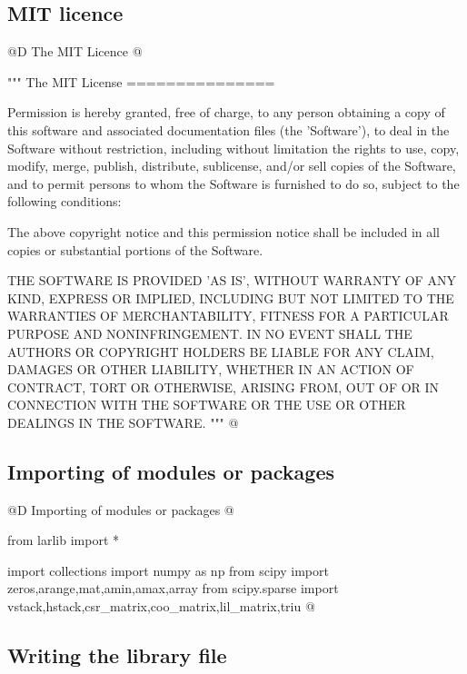 \documentclass[11pt,oneside]{article}	%
\begin{document}
\subsection{MIT licence}
@D The MIT Licence
@{
"""
The MIT License
===============
	
Permission is hereby granted, free of charge, to any person obtaining
a copy of this software and associated documentation files (the
'Software'), to deal in the Software without restriction, including
without limitation the rights to use, copy, modify, merge, publish,
distribute, sublicense, and/or sell copies of the Software, and to
permit persons to whom the Software is furnished to do so, subject to
the following conditions:

The above copyright notice and this permission notice shall be
included in all copies or substantial portions of the Software.

THE SOFTWARE IS PROVIDED 'AS IS', WITHOUT WARRANTY OF ANY KIND,
EXPRESS OR IMPLIED, INCLUDING BUT NOT LIMITED TO THE WARRANTIES OF
MERCHANTABILITY, FITNESS FOR A PARTICULAR PURPOSE AND NONINFRINGEMENT.
IN NO EVENT SHALL THE AUTHORS OR COPYRIGHT HOLDERS BE LIABLE FOR ANY
CLAIM, DAMAGES OR OTHER LIABILITY, WHETHER IN AN ACTION OF CONTRACT,
TORT OR OTHERWISE, ARISING FROM, OUT OF OR IN CONNECTION WITH THE
SOFTWARE OR THE USE OR OTHER DEALINGS IN THE SOFTWARE.
"""
@}
\subsection{Importing of modules or packages}
@D Importing of modules or packages
@{from larlib import *

import collections
import numpy as np
from scipy import zeros,arange,mat,amin,amax,array
from scipy.sparse import vstack,hstack,csr_matrix,coo_matrix,lil_matrix,triu
@}

\subsection{Writing the library file}
\end{document}
